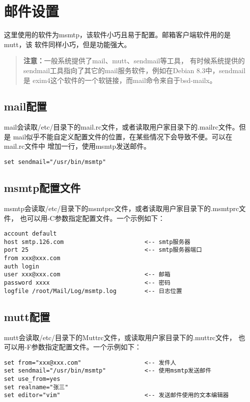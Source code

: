 ﻿\chapter{邮件设置}

这里使用的软件为msmtp，该软件小巧且易于配置。邮箱客户端软件用的是mutt，该%
软件同样小巧，但是功能强大。

\begin{quote}\kaishu
\textbf{注意：}一般系统提供了mail、mutt、sendmail等工具，%
有时候系统提供的sendmail工具指向了其它的mail服务软件，例如在Debian 8.3中，sendmail是%
exim4这个软件的一个软链接，而mail命令来自于bsd-mailx。
\end{quote}

\section{mail配置}
mail会读取/etc/目录下的mail.rc文件，或者读取用户家目录下的.mailrc文件。但是%
mail似乎不能自定义配置文件的位置，在某些情况下会导致不便。可以在mail.rc文件中%
增加一行，使用msmtp发送邮件。

\begin{Verbatim}[]
set sendmail="/usr/bin/msmtp"
\end{Verbatim}

\section{msmtp配置文件}

msmtp会读取/etc/目录下的msmtprc文件，或者读取用户家目录下的.msmtprc文件，%
也可以用-C参数指定配置文件。一个示例如下：

\begin{Verbatim}[]
account default
host smtp.126.com                       <-- smtp服务器
port 25                                 <-- smtp服务器端口
from xxx@xxx.com
auth login
user xxx@xxx.com                        <-- 邮箱
password xxxx                           <-- 密码
logfile /root/Mail/Log/msmtp.log        <-- 日志位置
\end{Verbatim}


\section{mutt配置}
mutt会读取/etc/目录下的Muttrc文件，或读取用户家目录下的.muttrc文件，%
也可以用-F参数指定配置文件。一个示例如下：
\begin{Verbatim}[]
set from="xxx@xxx.com"                  <-- 发件人
set sendmail="/usr/bin/msmtp"           <-- 使用msmtp发送邮件
set use_from=yes
set realname="张三"
set editor="vim"                        <-- 发送邮件使用的文本编辑器
\end{Verbatim}

